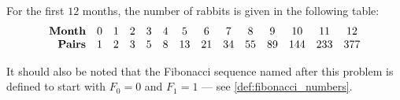 \begin{example}
  For the first \( 12 \) months, the number of rabbits is given in the following table:
  \begin{equation*}
    \begin{array}{r *{13}{c}}
      \textbf{Month} & 0 & 1 & 2 & 3 & 4 & 5  & 6  & 7  & 8  & 9  & 10  & 11  & 12  \\
      \textbf{Pairs} & 1 & 2 & 3 & 5 & 8 & 13 & 21 & 34 & 55 & 89 & 144 & 233 & 377 \\
    \end{array}
  \end{equation*}

  It should also be noted that the Fibonacci sequence named after this problem is defined to start with \( F_0 = 0 \) and \( F_1 = 1 \) --- see \cref{def:fibonacci_numbers}.
\end{example}
